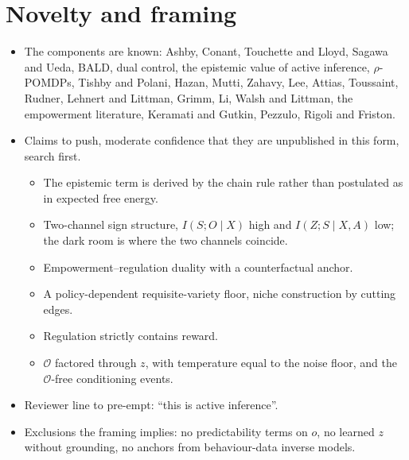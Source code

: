 \documentclass[10pt]{article}
\begin{document}
\section{Novelty and framing}
\begin{itemize}
  \item The components are known: Ashby, Conant, Touchette and Lloyd, Sagawa and Ueda, BALD, dual control, the epistemic value of active inference, $\rho$-POMDPs, Tishby and Polani, Hazan, Mutti, Zahavy, Lee, Attias, Toussaint, Rudner, Lehnert and Littman, Grimm, Li, Walsh and Littman, the empowerment literature, Keramati and Gutkin, Pezzulo, Rigoli and Friston.
  \item Claims to push, moderate confidence that they are unpublished in this form, search first.
  \begin{itemize}
    \item The epistemic term is derived by the chain rule rather than postulated as in expected free energy.
    \item Two-channel sign structure, $I(S;O \mid X)$ high and $I(Z;S \mid X,A)$ low; the dark room is where the two channels coincide.
    \item Empowerment--regulation duality with a counterfactual anchor.
    \item A policy-dependent requisite-variety floor, niche construction by cutting edges.
    \item Regulation strictly contains reward.
    \item $\mathcal O$ factored through $z$, with temperature equal to the noise floor, and the $\mathcal O$-free conditioning events.
  \end{itemize}
  \item Reviewer line to pre-empt: ``this is active inference''.
  \item Exclusions the framing implies: no predictability terms on $o$, no learned $z$ without grounding, no anchors from behaviour-data inverse models.
\end{itemize}
\end{document}
